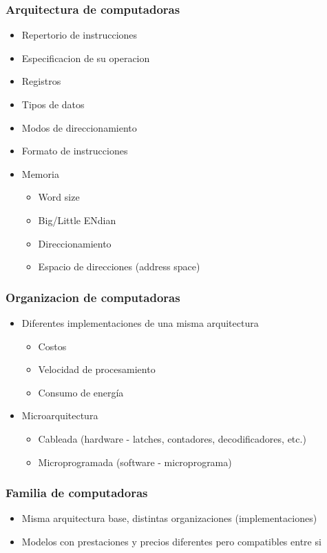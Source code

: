 \subsubsection{Arquitectura de computadoras}
\begin{itemize}
\item Repertorio de instrucciones
\item  Especificacion de su operacion
\item  Registros
\item  Tipos de datos
\item  Modos de direccionamiento
\item  Formato de instrucciones
\item  Memoria
	\begin{itemize}
	\item  Word size
	\item  Big/Little  ENdian
	\item  Direccionamiento
	\item   Espacio de direcciones (address space)
	\end{itemize}
\end{itemize}

\subsubsection{Organizacion de computadoras}
\begin{itemize}
\item Diferentes implementaciones de una misma arquitectura
	\begin{itemize}
	\item  Costos
	\item  Velocidad de procesamiento
	\item  Consumo de energía
	\end{itemize}
\item Microarquitectura
	\begin{itemize}
	\item  Cableada (hardware - latches, contadores, decodificadores, etc.)
	\item  Microprogramada (software - microprograma)
	\end{itemize}
\end{itemize}

\subsubsection{Familia de computadoras}
\begin{itemize}
\item Misma arquitectura base, distintas organizaciones (implementaciones)
\item Modelos con prestaciones y precios diferentes pero compatibles entre si
\end{itemize}

